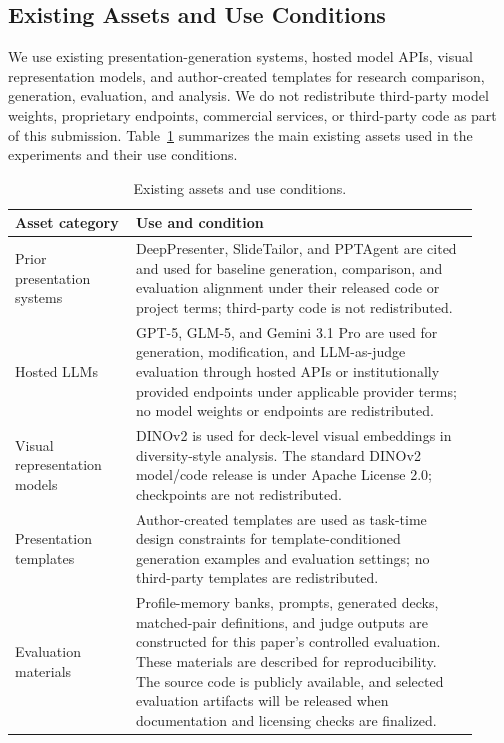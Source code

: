 \documentclass{llmxive}
\begin{document}
\subsection{Existing Assets and Use Conditions}

We use existing presentation-generation systems, hosted model APIs, visual
representation models, and author-created templates for research comparison,
generation, evaluation, and analysis. We do not redistribute third-party model
weights, proprietary endpoints, commercial services, or third-party code as
part of this submission. Table~\ref{tab:existing_assets} summarizes the main
existing assets used in the experiments and their use conditions.

\begin{table}[!htbp]
\centering
\small
\setlength{\tabcolsep}{5pt}
\begin{tabular}{p{0.24\linewidth}p{0.68\linewidth}}
\toprule
Asset category & Use and condition \\
\midrule
Prior presentation systems &
DeepPresenter, SlideTailor, and PPTAgent are cited and used for baseline
generation, comparison, and evaluation alignment under their released code or
project terms; third-party code is not redistributed. \\
\midrule
Hosted LLMs &
GPT-5, GLM-5, and Gemini 3.1 Pro are used for generation, modification, and
LLM-as-judge evaluation through hosted APIs or institutionally provided endpoints under
applicable provider terms; no model weights or endpoints are redistributed. \\
\midrule
Visual representation models &
DINOv2 is used for deck-level visual embeddings in diversity-style analysis.
The standard DINOv2 model/code release is under Apache License 2.0; checkpoints
are not redistributed. \\
\midrule
Presentation templates &
Author-created templates are used as task-time design constraints for
template-conditioned generation examples and evaluation settings; no
third-party templates are redistributed. \\
\midrule
Evaluation materials &
Profile-memory banks, prompts, generated decks, matched-pair definitions, and
judge outputs are constructed for this paper's controlled evaluation. These
materials are described for reproducibility. The source code is publicly
available, and selected evaluation artifacts will be released when
documentation and licensing checks are finalized. \\
\bottomrule
\end{tabular}
\caption{Existing assets and use conditions.}
\label{tab:existing_assets}
\end{table}
\end{document}
